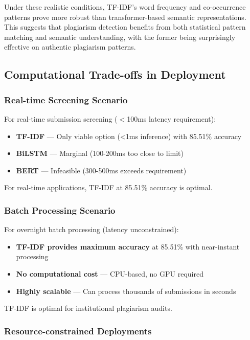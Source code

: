 Under these realistic conditions, TF-IDF's word frequency and co-occurrence patterns prove more robust than transformer-based semantic representations. This suggests that plagiarism detection benefits from both statistical pattern matching and semantic understanding, with the former being surprisingly effective on authentic plagiarism patterns.

\subsection{Computational Trade-offs in Deployment}

\subsubsection{Real-time Screening Scenario}

For real-time submission screening ($<$100ms latency requirement):

\begin{itemize}
  \item \textbf{TF-IDF} --- Only viable option (\textless 1ms inference) with 85.51\% accuracy
  \item \textbf{BiLSTM} --- Marginal (100-200ms too close to limit)
  \item \textbf{BERT} --- Infeasible (300-500ms exceeds requirement)
\end{itemize}

For real-time applications, TF-IDF at 85.51\% accuracy is optimal.

\subsubsection{Batch Processing Scenario}

For overnight batch processing (latency unconstrained):

\begin{itemize}
  \item \textbf{TF-IDF provides maximum accuracy} at 85.51\% with near-instant processing
  \item \textbf{No computational cost} --- CPU-based, no GPU required
  \item \textbf{Highly scalable} --- Can process thousands of submissions in seconds
\end{itemize}

TF-IDF is optimal for institutional plagiarism audits.

\subsubsection{Resource-constrained Deployments}

